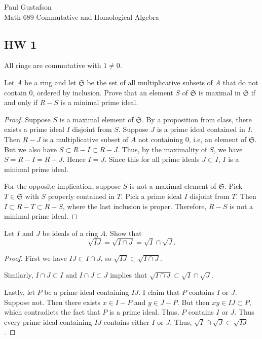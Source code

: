 \documentclass{article}
\begin{document}
\noindent Paul Gustafson\\
\noindent Math 689 Commutative and Homological Algebra

\subsection*{HW 1}
All rings are commutative with $1 \neq 0$.

\vskip 5pt

 Let $A$ be a ring and let $\mathfrak S$ be the set of all multiplicative subsets of $A$ that do not contain $0$, ordered by inclusion.  Prove that an element $S$ of $\mathfrak S$ is maximal in $\mathfrak S$ if and only if $R - S$ is a minimal prime ideal.
\begin{proof}
Suppose $S$ is a maximal element of $\mathfrak S$. By a proposition from class, there exists a prime ideal $I$ disjoint from $S$.  Suppose $J$ is a prime ideal contained in $I$.  Then $R - J$ is a multiplicative subset of $A$ not containing $0$, i.e, an element of $\mathfrak S$.  But we also have $S \subset R - I \subset R -J$. Thus, by the maximality of $S$, we have $S = R - I = R - J$.  Hence $I = J$. Since this for all prime ideals $J \subset I$, $I$ is a minimal prime ideal.

For the opposite implication, suppose $S$ is not a maximal element of $\mathfrak S$. Pick $T \in \mathfrak S$ with $S$ properly contained in $T$.  Pick a prime ideal $I$ disjoint from $T$. Then
$I \subset R - T \subset R - S$, where the last inclusion is proper.  Therefore, $R - S$ is not a minimal prime ideal.
\end{proof}

 Let $I$ and $J$ be ideals of a ring $A$. Show that 
$$\sqrt{IJ} = \sqrt{ I \cap J }   = \sqrt I \cap \sqrt J .$$

\begin{proof}
First we have $IJ \subset I \cap J$, so $\sqrt{IJ} \subset \sqrt{ I \cap J}$.

Similarly, $I \cap J \subset I$ and $I \cap J \subset J$ implies that $\sqrt{ I \cap J }   \subset \sqrt I \cap \sqrt J$.


Lastly, let $P$ be a prime ideal containing $IJ$.  I claim that $P$ contains $I$ or $J$. Suppose not.  Then there exists $x \in I - P$ and $y \in J - P$.
But then $xy \in IJ \subset P$, which contradicts the fact that $P$ is a prime ideal. Thus, $P$ contains $I$ or $J$. Thus every prime ideal containing $IJ$ contains either $I$ or $J$. Thus, $\sqrt I \cap \sqrt J \subset \sqrt{IJ}$.
\end{proof}
\end{document}
